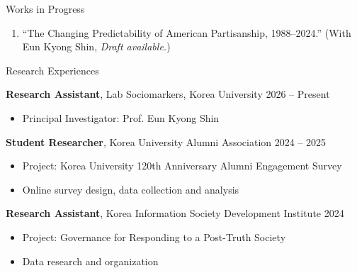 \documentclass{resume} %
\begin{document}

\begin{rSection}{Works in Progress}

\begin{enumerate}
  \item ``The Changing Predictability of American Partisanship, 1988--2024.''
  (With Eun Kyong Shin, {\em Draft available.})
\end{enumerate}

\end{rSection}


\begin{rSection}{Research Experiences}

{\bf Research Assistant}{, Lab Sociomarkers, Korea University} \hfill {2026 -- Present}
\begin{itemize}
  \item Principal Investigator: Prof. Eun Kyong Shin
\end{itemize}
\smallskip
{\bf Student Researcher}{, Korea University Alumni Association} \hfill {2024 -- 2025}
\begin{itemize}
  \item Project: Korea University 120th Anniversary Alumni Engagement Survey
  \item Online survey design, data collection and analysis
\end{itemize}
\smallskip
{\bf Research Assistant}{, Korea Information Society Development Institute} \hfill {2024}
\begin{itemize}
  \item Project: Governance for Responding to a Post-Truth Society
  \item Data research and organization
\end{itemize}

\end{rSection}

\end{document}
